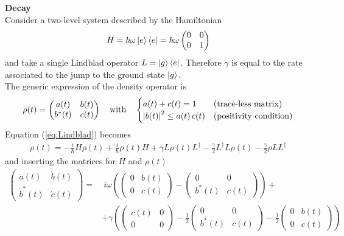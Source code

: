 \begin{tcolorbox} 
\textbf{Decay} \\ 
Consider a two-level system described by the Hamiltonian 
\begin{align*}
    H = \hbar \omega \ket{e}\bra{e} = \hbar \omega \begin{pmatrix} 0 & 0 \\ 0 & 1 \end{pmatrix}
\end{align*}
and take a single Lindblad operator $L = \ket{g}\bra{e}$. Therefore $\gamma$ is equal to the rate associated to the jump to the ground state $\ket{g}$. \\
The generic expression of the density operator is 
\begin{align}
    \rho(t) = \begin{pmatrix} a(t) & b(t) \\ b^*(t) & c(t) \end{pmatrix} \quad \text{with} \quad \begin{cases} a(t) + c(t) = 1 & \text{(trace-less matrix)} \\ \abs{b(t)}^2 \leq a(t) \, c(t) & \text{(positivity condition)} \end{cases}
    \label{eq:gen_rho}
\end{align}
Equation (\ref{eq:Lindblad}) becomes 
\begin{align*}
    \dot{\rho}(t) = -\frac{i}{\hbar} H \rho(t) + \frac{i}{\hbar} \rho(t) H + \gamma L \rho(t) L^\dagger - \frac{\gamma}{2} L^\dagger L \rho(t) - \frac{\gamma}{2} \rho L L^\dagger 
\end{align*}
and inserting the matrices for $H$ and $\rho(t)$
\begin{align*}
    \begin{pmatrix} \dot{a}(t) & \dot{b}(t) \\ \dot{b}^*(t) & \dot{c}(t) \end{pmatrix} =&~ i \omega \left( \begin{pmatrix} 0 & b(t) \\ 0 & c(t) \end{pmatrix} - \begin{pmatrix} 0 & 0 \\ b^*(t) & c(t) \end{pmatrix} \right) + \\
    & + \gamma \left( \begin{pmatrix} c(t) & 0 \\ 0 & 0 \end{pmatrix} - \frac{1}{2} \begin{pmatrix} 0 & 0 \\ b^*(t) & c(t) \end{pmatrix} - \frac{1}{2} \begin{pmatrix} 0 & b(t) \\ 0 & c(t) \end{pmatrix} \right)

\end{align*}
\end{tcolorbox}
